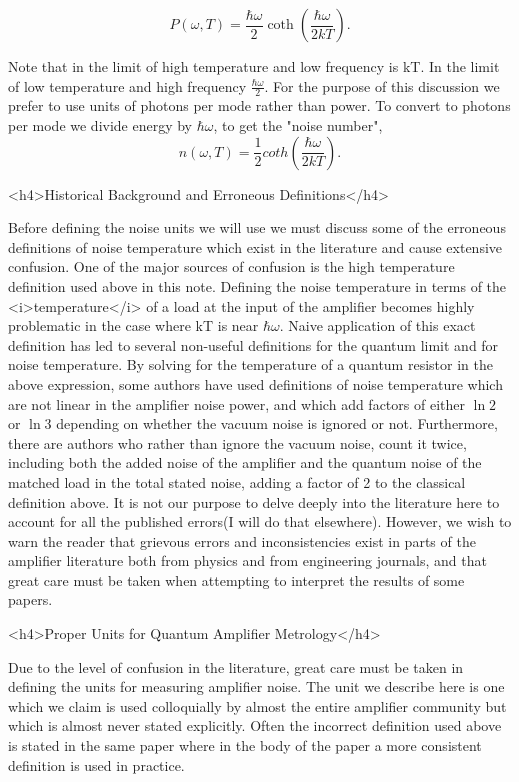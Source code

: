 \documentclass[11pt]{article}
\begin{document}
$$P(\omega,T)=\frac{\hbar\omega}{2}\coth{\left(\frac{\hbar\omega}{2kT}\right)}.$$


Note that in the limit of high temperature and low frequency is kT.  In the limit of low temperature and high frequency $\frac{\hbar\omega}{2}$.  For the purpose of this discussion we prefer to use units of photons per mode rather than power.  To convert to photons per mode we divide energy by $\hbar\omega$, to get the "noise number", 
$$n(\omega,T)=\frac{1}{2}coth{\left(\frac{\hbar\omega}{2kT}\right)}.$$


<h4>Historical Background and Erroneous Definitions</h4>



    	Before defining the noise units we will use we must discuss some of the erroneous definitions of noise temperature which exist in the literature and cause extensive confusion.  One of the major sources of confusion is the high temperature definition used above in this note.  Defining the noise temperature in terms of the <i>temperature</i> of a load at the input of the amplifier becomes highly problematic in the case where kT is near $\hbar\omega$.  Naive application of this exact definition has led to several non-useful definitions for the quantum limit and for noise temperature.  By solving for the temperature of a quantum resistor in the above expression, some authors have used definitions of noise temperature which are not linear in the amplifier noise power, and which add factors of either $\ln{2}$ or $\ln{3}$ depending on whether the vacuum noise is ignored or not.  Furthermore, there are authors who rather than ignore the vacuum noise, count it twice, including both the added noise of the amplifier and the quantum noise of the matched load in the total stated noise, adding a factor of 2 to the classical definition above.  It is not our purpose to delve deeply into the literature here to account for all the published errors(I will do that elsewhere).   However, we wish to warn the reader that grievous errors and inconsistencies exist in parts of the amplifier literature both from physics and from engineering journals, and that great care must be taken when attempting to interpret the results of some papers.  

<h4>Proper Units for Quantum Amplifier Metrology</h4>




    	Due to the level of confusion in the literature, great care must be taken in defining the units for measuring amplifier noise.  The unit we describe here is one which we claim is used colloquially by almost the entire amplifier community but which is almost never stated explicitly.  Often the incorrect definition used above is stated in the same paper where in the body of the paper a more consistent definition is used in practice.  
\end{document}

